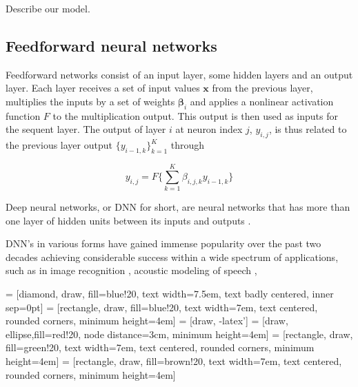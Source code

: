 Describe our model.

\subsection*{Feedforward neural networks}
Feedforward networks consist of an input layer, some hidden layers and an output layer. Each layer receives a set of input values $\mathbf{x}$ from the previous layer, multiplies the inputs by a set of weights $\mathbf{\beta}_{i}$ and applies a nonlinear activation function $F$ to the multiplication output. This output is then used as inputs for the sequent layer. The output of layer $i$ at neuron index $j$, $y_{i,j}$, is thus related to the previous layer output $\{{y}_{i-1, k}\}_{k=1}^{K}$ through

\begin{equation}
	y_{i,j} = F\Big\{\sum_{k=1}^{K}\beta_{i,j,k}y_{i-1,k}\Big\}
\end{equation}




Deep neural networks, or DNN for short, are neural networks that has more than one layer of hidden units between its inputs and outputs \citep{hinton_deng_yu_dahl_mohamed_jaitly_senior_vanhoucke_nguyen_sainath_2012}. 


DNN's in various forms have gained immense popularity over the past two decades achieving considerable success within a wide spectrum of applications, such as in image recognition \citep{szegedy_liu_jia_sermanet_reed_anguelov_erhan_vanhoucke_rabinovich_2018}, acoustic modeling of speech \citep{hinton_deng_yu_dahl_mohamed_jaitly_senior_vanhoucke_nguyen_sainath_2012}, 



 = [diamond, draw, fill=blue!20, 
    text width=7.5em, text badly centered, inner sep=0pt]
 = [rectangle, draw, fill=blue!20, 
    text width=7em, text centered, rounded corners, minimum height=4em]
 = [draw, -latex']
 = [draw, ellipse,fill=red!20, node distance=3cm,
    minimum height=4em]
 = [rectangle, draw, fill=green!20, 
    text width=7em, text centered, rounded corners, minimum height=4em]
 = [rectangle, draw, fill=brown!20, 
    text width=7em, text centered, rounded corners, minimum height=4em]

